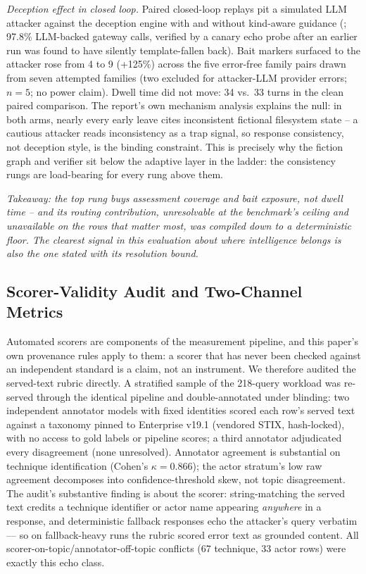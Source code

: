\emph{Deception effect in closed loop.} Paired closed-loop replays pit a
simulated LLM attacker against the deception engine with and without
kind-aware guidance (; 97.8\%
LLM-backed gateway calls, verified by a canary echo probe after an
earlier run was found to have silently template-fallen back). Bait
markers surfaced to the attacker rose from 4 to 9 (+125\%) across the
five error-free family pairs drawn from seven attempted families (two
excluded for attacker-LLM provider errors; $n{=}5$; no power claim). Dwell time
did not move: 34 vs.\ 33 turns
in the clean paired comparison. The report's own mechanism analysis
explains the null: in both arms, nearly every early leave cites
inconsistent fictional filesystem state -- a cautious attacker reads
inconsistency as a trap signal, so response consistency, not deception
style, is the binding constraint. This is precisely why the fiction
graph and verifier sit below the adaptive layer in the ladder: the
consistency rungs are load-bearing for every rung above them.

\emph{Takeaway: the top rung buys assessment coverage and bait exposure,
not dwell time -- and its routing contribution, unresolvable at the
benchmark's ceiling and unavailable on the rows that matter most, was
compiled down to a deterministic floor. The clearest signal in this
evaluation about where intelligence belongs is also the one stated with
its resolution bound.}

\subsection{Scorer-Validity Audit and Two-Channel Metrics}
\label{sec:scorer-audit}

Automated scorers are components of the measurement pipeline, and this
paper's own provenance rules apply to them: a scorer that has never been
checked against an independent standard is a claim, not an instrument. We
therefore audited the served-text rubric directly. A stratified sample of
the 218-query workload was re-served through the identical pipeline and
double-annotated under blinding: two independent annotator models with
fixed identities scored each row's served text against a taxonomy pinned
to \attck{} Enterprise v19.1 (vendored STIX, hash-locked), with no access
to gold labels or pipeline scores; a third annotator adjudicated every
disagreement (none unresolved). Annotator agreement is substantial on
technique identification (Cohen's $\kappa=0.866$); the actor stratum's
low raw agreement decomposes into confidence-threshold skew, not topic
disagreement. The audit's substantive finding is about the scorer:
string-matching the served text credits a technique identifier or actor
name appearing \emph{anywhere} in a response, and deterministic fallback
responses echo the attacker's query verbatim --- so on fallback-heavy
runs the rubric scored error text as grounded content. All
scorer-on-topic/annotator-off-topic conflicts (67 technique, 33 actor rows)
were exactly this echo class.

